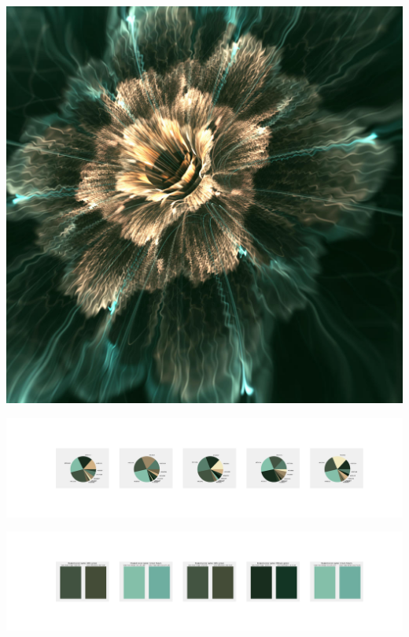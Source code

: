 \documentclass[11pt]{article}
\begin{document}
\begin{landscape}
    \begin{center}
    \includegraphics[width=\textwidth]{./nbimg/file (188).jpg}
    \end{center}

    \begin{center}
    \includegraphics[width=250mm]{./nbimg/pie-98.jpg}
    \end{center}

    \begin{center}
    \includegraphics[width=250mm]{./nbimg/peak-98.jpg}
    \end{center}
    


\end{landscape}
\end{document}
